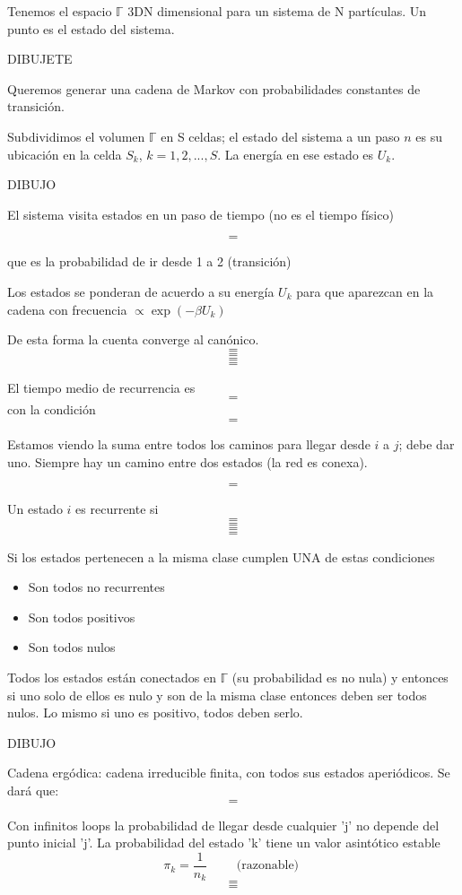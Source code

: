 \documentclass[10pt,oneside]{CBFT_book}
\begin{document}
Tenemos el espacio $ \mathbb{\Gamma} $ 3DN dimensional para un sistema de N partículas.
Un punto es el estado del sistema.

DIBUJETE

Queremos generar una cadena de Markov con probabilidades constantes de transición.

Subdividimos el volumen $ \mathbb{\Gamma} $  en S celdas; el estado del sistema a un paso $n$ es su
ubicación en la celda $S_k$, $k=1,2,...,S$. La energía en ese estado es $U_k$.

DIBUJO 

El sistema visita estados en un paso de tiempo (no es el tiempo físico)

\[=\]

que es la probabilidad de ir desde 1 a 2 (transición)

Los estados se ponderan de acuerdo a su energía $U_k$ para que aparezcan en la cadena con frecuencia
$ \propto \exp(-\beta U_k ) $

De esta forma la cuenta converge al canónico.
\[=\]
\[=\]
\[=\]
\[=\]

El tiempo medio de recurrencia es
\[=\]
con la condición 
\[=\]

Estamos viendo la suma entre todos los caminos para llegar desde $i$ a $j$; debe dar uno.
Siempre hay un camino entre dos estados (la red es conexa).

\[=\]

Un estado $i$ es recurrente si 
\[=\]
\[=\]
\[=\]
\[=\]


Si los estados pertenecen a la misma clase cumplen UNA de estas condiciones 
\begin{itemize}
 \item Son todos no recurrentes
 \item Son todos positivos
 \item Son todos nulos
\end{itemize}

Todos los estados están conectados en $ \mathbb{\Gamma} $  (su probabilidad es no nula) y entonces
si uno solo de ellos es nulo y son de la misma clase entonces deben ser todos nulos.
Lo mismo si uno es positivo, todos deben serlo.

DIBUJO 

Cadena ergódica: cadena irreducible finita, con todos sus estados aperiódicos. 
Se dará que:
\[=\]

Con infinitos loops la probabilidad de llegar desde cualquier 'j' no depende del punto inicial 'j'.
La probabilidad del estado 'k' tiene un valor asintótico estable
\[
	\pi_k = \frac{1}{n_k} \qquad \text{ (razonable) } 
\]
\[=\]
\[=\]
\end{document}
